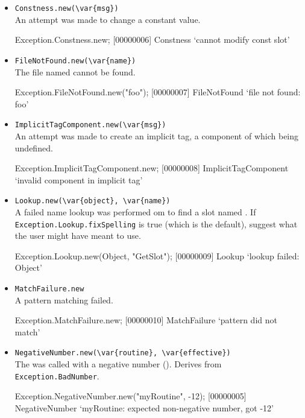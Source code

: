 \begin{itemize}
\item \lstinline|Constness.new(\var{msg})|\\
  An attempt was made to change a constant value.
\begin{urbiscript}
Exception.Constness.new;
[00000006] Constness `cannot modify const slot'
\end{urbiscript}

\item \lstinline|FileNotFound.new(\var{name})|\\
  The file named  cannot be found.
\begin{urbiscript}
Exception.FileNotFound.new("foo");
[00000007] FileNotFound `file not found: foo'
\end{urbiscript}

\item \lstinline|ImplicitTagComponent.new(\var{msg})|\\
  An attempt was made to create an implicit tag, a component of which
  being undefined.
\begin{urbiscript}
Exception.ImplicitTagComponent.new;
[00000008] ImplicitTagComponent `invalid component in implicit tag'
\end{urbiscript}

\item \lstinline|Lookup.new(\var{object}, \var{name})|\\
  A failed name lookup was performed om  to find a slot
  named .  If \lstinline|Exception.Lookup.fixSpelling| is
  true (which is the default), suggest what the user might have meant
  to use.
\begin{urbiscript}
Exception.Lookup.new(Object, "GetSlot");
[00000009] Lookup `lookup failed: Object'
\end{urbiscript}

\item \lstinline|MatchFailure.new|\\
  A pattern matching failed.
\begin{urbiscript}
Exception.MatchFailure.new;
[00000010] MatchFailure `pattern did not match'
\end{urbiscript}

\item \lstinline|NegativeNumber.new(\var{routine}, \var{effective})|\\
  The  was called with a negative number
  ().  Derives from \lstinline|Exception.BadNumber|.
\begin{urbiscript}
Exception.NegativeNumber.new("myRoutine", -12);
[00000005] NegativeNumber `myRoutine: expected non-negative number, got -12'
\end{urbiscript}


\end{itemize}
